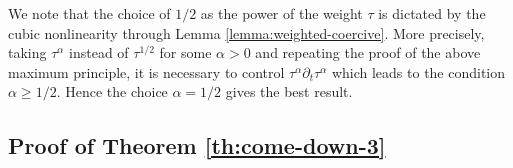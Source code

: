 \documentclass[a4paper,11pt]{article}
\renewcommand{\geq}{\geqslant}
\numberwithin{equation}{section}
\newcommand{\8}{\infty}
\begin{document}
\begin{remark}\label{rem:down}
We note that the choice of $1/2$ as the power of the weight $\tau$ is dictated by the cubic nonlinearity through Lemma \ref{lemma:weighted-coercive}. More precisely, taking $\tau^{\alpha}$ instead of $\tau^{1/2}$ for some $\alpha>0$ and repeating the proof of the above maximum principle, it is necessary to control $\tau^{\alpha}\partial_{t}\tau^{\alpha}$ which leads to the condition $\alpha\geq 1/2$. Hence the choice $\alpha=1/2$ gives the best result.
\end{remark}


\subsection{Proof of Theorem \ref{th:come-down-3}}
\label{ss:thm91}
\end{document}
